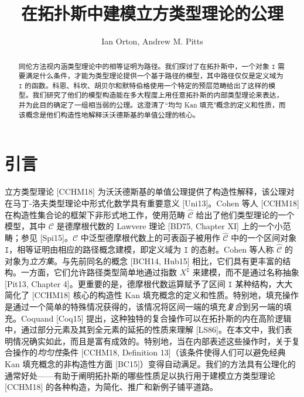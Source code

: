 \documentclass{ctexart}
\title{在拓扑斯中建模立方类型理论的公理}
\author{Ian Orton, Andrew M. Pitts}
\date{}
\theoremstyle{plain}
\theoremstyle{definition}
\theoremstyle{definition}
\theoremstyle{definition}
\theoremstyle{definition}
\newcommand\ttI{\mathtt{I}}
\numberwithin{equation}{section}
\begin{document}
\maketitle
\begin{abstract}
同伦方法视内涵类型理论中的相等证明为路径。我们探讨了在拓扑斯中，一个对象 $\ttI$ 需要满足什么条件，才能为类型理论提供一个基于路径的模型，其中路径仅仅是定义域为 $\ttI$ 的函数。科恩、科坎、胡贝尔和默特伯格使用一个特定的预层范畴给出了这样的模型。我们研究了他们的模型构造能在多大程度上用任意拓扑斯的内部类型理论来表达，并为此目的确定了一组相当弱的公理。这澄清了``均匀 Kan 填充"概念的定义和性质，而该概念是他们构造性地解释沃沃德斯基的单值公理的核心。
\end{abstract}

\section{引言}

立方类型理论 [CCHM18] 为沃沃德斯基的单值公理提供了构造性解释，该公理对在马丁-洛夫类型理论中形式化数学具有重要意义 [Uni13]。Cohen 等人 [CCHM18] 在构造性集合论的框架下非形式地工作，使用范畴 $\hat{\mathcal{C}}$ 给出了他们类型理论的一个模型，其中 $\mathcal{C}$ 是德摩根代数的 Lawvere 理论 [BD75, Chapter XI] 上的一个小范畴；参见 [Spi15]。$\mathcal{C}$ 中泛型德摩根代数上的可表函子被用作 $\hat{\mathcal{C}}$ 中的一个区间对象 $\ttI$，相等证明由相应的路径概念建模，即定义域为 $\ttI$ 的态射。Cohen 等人称 $\hat{\mathcal{C}}$ 的对象为\textit{立方集}。与先前同名的概念 [BCH14, Hub15] 相比，它们具有更丰富的结构。一方面，它们允许路径类型简单地通过指数 $X^{\ttI}$ 来建模，而不是通过名称抽象 [Pit13, Chapter 4]。更重要的是，德摩根代数运算赋予了区间 $\ttI$ 某种结构，大大简化了 [CCHM18] 核心的构造性 Kan 填充概念的定义和性质。特别地，填充操作是通过一个简单的特殊情况获得的，该情况将区间一端的填充\textit{复合}到另一端的填充。Coquand [Coq15] 提出，这种独特的复合操作可以在拓扑斯的内在高阶逻辑中，通过部分元素及其到全元素的延拓的性质来理解 [LS86]。在本文中，我们表明情况确实如此，而且是富有成效的。特别地，当在内部表述这些操作时，关于复合操作的\textit{均匀性}条件 [CCHM18, Definition 13]（该条件使得人们可以避免经典 Kan 填充概念的非构造性方面 [BC15]）变得自动满足。我们的方法具有公理化的通常好处——有助于阐明拓扑斯的哪些性质足以执行用于建模立方类型理论 [CCHM18] 的各种构造，为简化、推广和新例子铺平道路。
\end{document}
